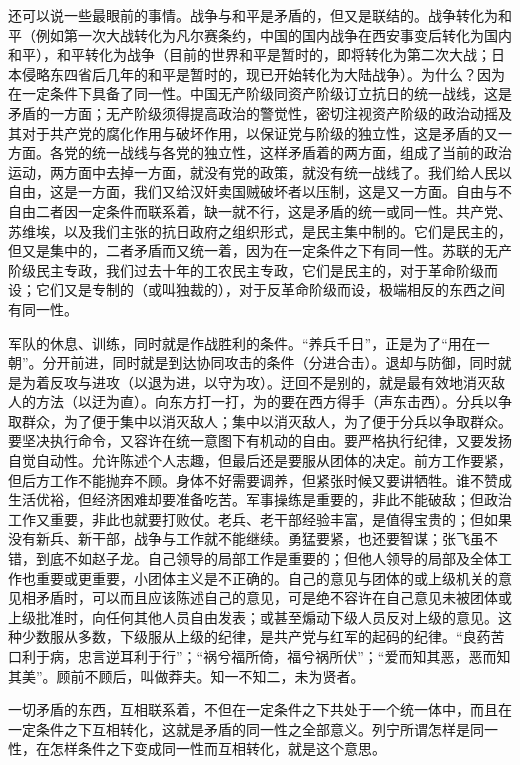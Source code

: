 \documentclass[UTF8, 12pt, a4paper]{ctexrep}
\begin{document}
还可以说一些最眼前的事情。战争与和平是矛盾的，但又是联结的。战争转化为和平（例如第一次大战转化为凡尔赛条约，中国的国内战争在西安事变后转化为国内和平），和平转化为战争（目前的世界和平是暂时的，即将转化为第二次大战；日本侵略东四省后几年的和平是暂时的，现已开始转化为大陆战争）。为什么？因为在一定条件下具备了同一性。中国无产阶级同资产阶级订立抗日的统一战线，这是矛盾的一方面；无产阶级须得提高政治的警觉性，密切注视资产阶级的政治动摇及其对于共产党的腐化作用与破坏作用，以保证党与阶级的独立性，这是矛盾的又一方面。各党的统一战线与各党的独立性，这样矛盾着的两方面，组成了当前的政治运动，两方面中去掉一方面，就没有党的政策，就没有统一战线了。我们给人民以自由，这是一方面，我们又给汉奸卖国贼破坏者以压制，这是又一方面。自由与不自由二者因一定条件而联系着，缺一就不行，这是矛盾的统一或同一性。共产党、苏维埃，以及我们主张的抗日政府之组织形式，是民主集中制的。它们是民主的，但又是集中的，二者矛盾而又统一着，因为在一定条件之下有同一性。苏联的无产阶级民主专政，我们过去十年的工农民主专政，它们是民主的，对于革命阶级而设；它们又是专制的（或叫独裁的），对于反革命阶级而设，极端相反的东西之间有同一性。

军队的休息、训练，同时就是作战胜利的条件。“养兵千日”，正是为了“用在一朝”。分开前进，同时就是到达协同攻击的条件（分进合击）。退却与防御，同时就是为着反攻与进攻（以退为进，以守为攻）。迂回不是别的，就是最有效地消灭敌人的方法（以迂为直）。向东方打一打，为的要在西方得手（声东击西）。分兵以争取群众，为了便于集中以消灭敌人；集中以消灭敌人，为了便于分兵以争取群众。要坚决执行命令，又容许在统一意图下有机动的自由。要严格执行纪律，又要发扬自觉自动性。允许陈述个人志趣，但最后还是要服从团体的决定。前方工作要紧，但后方工作不能抛弃不顾。身体不好需要调养，但紧张时候又要讲牺牲。谁不赞成生活优裕，但经济困难却要准备吃苦。军事操练是重要的，非此不能破敌；但政治工作又重要，非此也就要打败仗。老兵、老干部经验丰富，是值得宝贵的；但如果没有新兵、新干部，战争与工作就不能继续。勇猛要紧，也还要智谋；张飞虽不错，到底不如赵子龙。自己领导的局部工作是重要的；但他人领导的局部及全体工作也重要或更重要，小团体主义是不正确的。自己的意见与团体的或上级机关的意见相矛盾时，可以而且应该陈述自己的意见，可是绝不容许在自己意见未被团体或上级批准时，向任何其他人员自由发表；或甚至煽动下级人员反对上级的意见。这种少数服从多数，下级服从上级的纪律，是共产党与红军的起码的纪律。“良药苦口利于病，忠言逆耳利于行”；“祸兮福所倚，福兮祸所伏”；“爱而知其恶，恶而知其美”。顾前不顾后，叫做莽夫。知一不知二，未为贤者。

一切矛盾的东西，互相联系着，不但在一定条件之下共处于一个统一体中，而且在一定条件之下互相转化，这就是矛盾的同一性之全部意义。列宁所谓怎样是同一性，在怎样条件之下变成同一性而互相转化，就是这个意思。
\end{document}
